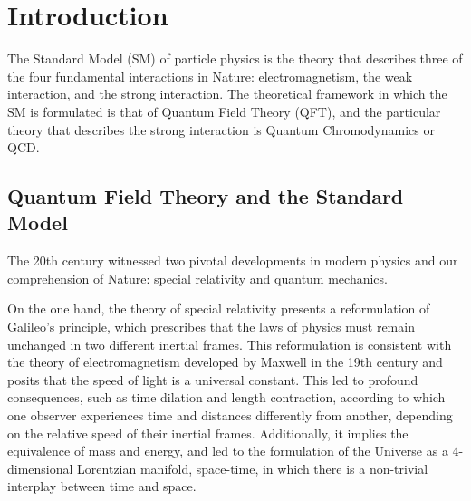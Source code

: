 \chapter*{Introduction}

\label{ch_introduction}



The Standard Model (SM) of particle physics is the theory that describes three of the four fundamental interactions in Nature: electromagnetism, the weak interaction, and the strong interaction. The theoretical framework in which the SM is formulated is that of Quantum Field Theory (QFT), and the particular theory that describes the strong interaction is Quantum Chromodynamics or QCD.

\section*{Quantum Field Theory and the Standard Model}

The 20th century witnessed two pivotal developments in modern physics and our comprehension of Nature: special relativity and quantum mechanics. 

On the one hand, the theory of special relativity presents a reformulation of Galileo's principle, which prescribes that the laws of physics must remain unchanged in two different inertial frames. This reformulation is consistent with the theory of electromagnetism developed by Maxwell in the 19th century and posits that the speed of light is a universal constant. This led to profound consequences, such as time dilation and length contraction, according to which one observer experiences time and distances differently from another, depending on the relative speed of their inertial frames. Additionally, it implies the equivalence of mass and energy, and led to the formulation of the Universe as a 4-dimensional Lorentzian manifold, space-time, in which there is a non-trivial interplay between time and space.

